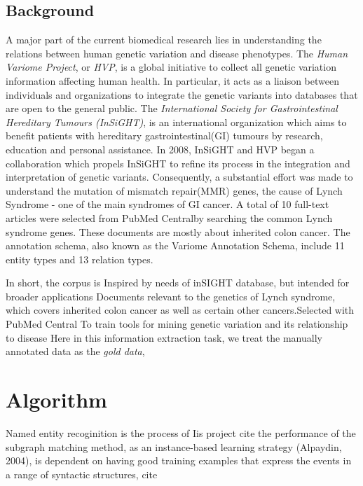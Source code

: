 \subsection{Background}
A major part of the current biomedical research lies in understanding the relations between human genetic variation and disease phenotypes. The \emph{Human Variome Project}, or \emph{HVP}, is a global initiative to collect all genetic variation information affecting human health\cite{ring2006human}. In particular, it acts as a liaison between individuals and organizations to integrate the genetic variants into databases that are open to the general public\cite{verspoor2013annotating}. The \emph{International Society for Gastrointestinal Hereditary Tumours (InSiGHT)}, is an international organization which aims to benefit patients with hereditary gastrointestinal(GI) tumours by research, education and personal assistance. In 2008, InSiGHT and HVP began a collaboration which propels InSiGHT to refine its process in the integration and interpretation of genetic variants. Consequently, a substantial effort was made to understand the mutation of mismatch repair(MMR) genes, the cause of Lynch Syndrome - one of the main syndromes of GI cancer\cite{silva2009mismatch}. A total of 10 full-text articles were selected from PubMed Central\textregistered by searching the common Lynch syndrome genes. These documents are mostly about inherited colon cancer. The annotation schema, also known as the Variome Annotation Schema\cite{verspoor2013annotating}, include 11 entity types and 13 relation types. 

In short, the corpus is Inspired by needs of inSIGHT database, but intended for broader applications Documents relevant to the genetics of Lynch syndrome, which covers inherited colon cancer as well as certain other cancers.Selected with PubMed Central To train tools for mining genetic variation and its relationship to disease
Here in this information extraction task, we treat the manually annotated data as the \emph{gold data}, 
\section{Algorithm}
Named entity recoginition is the process of 
Iis project 
cite
the performance of the subgraph matching method, as an instance-based learning strategy (Alpaydin, 2004), is dependent on having good training examples that express the events in a range of syntactic structures, cite

